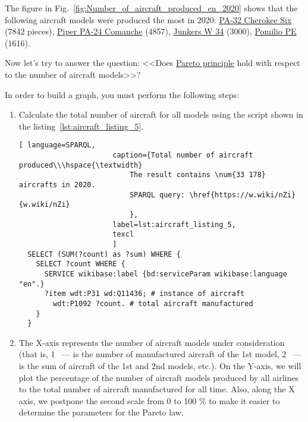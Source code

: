 The figure in Fig.~\ref{fig:Number_of_aircraft_produced_en_2020} shows that the following aircraft models were produced the most in 
2020: \href{https://www.wikidata.org/wiki/Q2096452}{PA-32 Cherokee Six} (\num{7842} pieces), \href{https://www.wikidata.org/wiki/Q1860367}{Piper PA-24 Comanche} 
(\num{4857}), \href{https://www.wikidata.org/wiki/Q694521}{Junkers W 34} (\num{3000}), \href{https://www.wikidata.org/wiki/Q941011}{Pomilio PE} 
(\num{1616}).

\begin{figure*}[h]

    \setlength{\fboxsep}{0pt}%
    \setlength{\fboxrule}{1pt}%

	\caption{Number of aircraft produced by model, 2020.}%
    \label{fig:Number_of_aircraft_produced_en_2020}%
\end{figure*}

Now let's try to answer the question: <<Does \href{https://en.wikipedia.org/wiki/Pareto_principle}{Pareto principle} hold with respect to the 
number of aircraft models>>?

In order to build a graph, you must perform the following steps:

\begin{enumerate} 
  \item Calculate the total number of aircraft for all models using the script shown in the listing~\ref{lst:aircraft_listing_5}.

  \begin{lstlisting}[ language=SPARQL, 
                      caption={Total number of aircraft produced\\\hspace{\textwidth}
                          The result contains \num{33 178} aircrafts in 2020.
                          SPARQL query: \href{https://w.wiki/nZi}{w.wiki/nZi}
                          },
                      label=lst:aircraft_listing_5,
                      texcl 
                      ]
  SELECT (SUM(?count) as ?sum) WHERE {
    SELECT ?count WHERE {
      SERVICE wikibase:label {bd:serviceParam wikibase:language "en".}
      ?item wdt:P31 wd:Q11436; # instance of aircraft
        wdt:P1092 ?count. # total aircraft manufactured
    }
  }
  \end{lstlisting}

  \item The X-axis represents the number of aircraft models under consideration (that is, 1 ~--- is the number of manufactured aircraft of the 1st 
  model, 2 ~--- is the sum of aircraft of the 1st and 2nd models, etc.). On the Y-axis, we will plot the percentage of the number of aircraft models 
  produced by all airlines to the total number of aircraft manufactured for all time. Also, along the X axis, we postpone the second scale from 
  0 to 100 \% to make it easier to determine the parameters for the Pareto law.
\end{enumerate}

